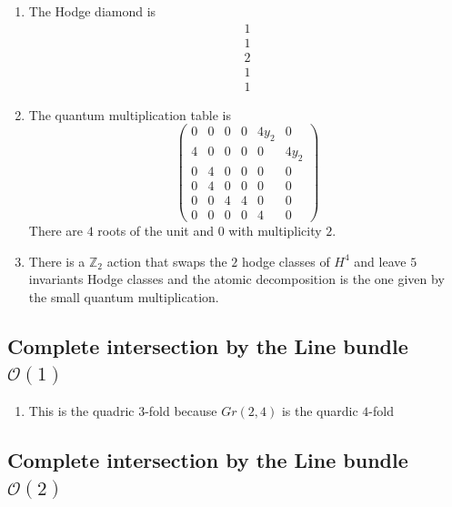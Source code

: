 \documentclass[11pt]{amsart}
\newcounter{num}[section] %
\begin{document}
\begin{enumerate}
    \item [1)]The Hodge diamond is
    \[
            \begin{array}{c}
             1  \\
             1\\
           2\\
            1\\
            1
        \end{array}
    \]

    \item[2)] The quantum multiplication table is 
    \[
    \begin{pmatrix}
        0 & 0 & 0 & 0 & 4y_2 & 0 \\
        4 & 0 & 0 & 0 & 0 & 4y_2 \\
        0 & 4 & 0 & 0 & 0 & 0 \\
        0 & 4 & 0 & 0 & 0 & 0 \\
        0 & 0 & 4 & 4 & 0 & 0 \\
        0 & 0 & 0 & 0 & 4 & 0
    \end{pmatrix}
    \]
There are $4$ roots of the unit and $0$ with multiplicity $2$.

\item[3)]There is a $\mathbb{Z}_2$ action that swaps the $2$ hodge classes of $H^4$ and leave $5$ invariants Hodge classes and the atomic decomposition is the one given by the small quantum multiplication. 
    
\end{enumerate}



\subsection{Complete intersection by the Line bundle $\mathcal{O}(1)$}

\begin{enumerate}
    \item [1)] This is the quadric $3$-fold because $Gr(2,4)$ is the quardic $4$-fold
\end{enumerate}

\subsection{Complete intersection by the Line bundle $\mathcal{O}(2)$}
\end{document}
